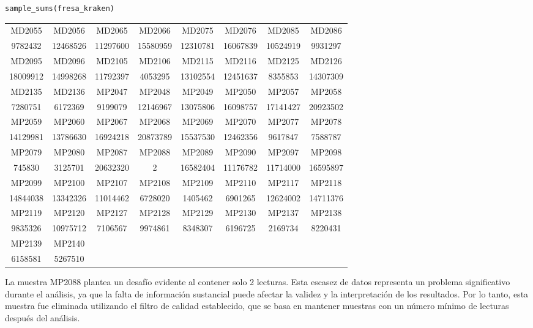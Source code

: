 \begin{lstlisting}[basicstyle=\small] 
sample_sums(fresa_kraken)
\end{lstlisting}
\resizebox{0.9\textwidth}{!} {
\begin{tabular}{ c c c c c c c c }
MD2055 & MD2056 & MD2065 & MD2066 & MD2075 & MD2076 & MD2085 & MD2086 \\
9782432 & 12468526 & 11297600 & 15580959 & 12310781 & 16067839 & 10524919 & 9931297 \\
MD2095 & MD2096 & MD2105 & MD2106 & MD2115 & MD2116 & MD2125 & MD2126 \\
18009912 & 14998268 & 11792397 & 4053295 & 13102554 & 12451637 & 8355853 & 14307309 \\
MD2135 & MD2136 & MP2047 & MP2048 & MP2049 & MP2050 & MP2057 & MP2058 \\
7280751 & 6172369 & 9199079 & 12146967 & 13075806 & 16098757 & 17141427 & 20923502 \\
MP2059 & MP2060 & MP2067 & MP2068 & MP2069 & MP2070 & MP2077 & MP2078 \\
14129981 & 13786630 & 16924218 & 20873789 & 15537530 & 12462356 & 9617847 & 7588787 \\
MP2079 & MP2080 & MP2087 & MP2088 & MP2089 & MP2090 & MP2097 & MP2098 \\
745830 & 3125701 & 20632320 & 2 & 16582404 & 11176782 & 11714000 & 16595897 \\
MP2099 & MP2100 & MP2107 & MP2108 & MP2109 & MP2110 & MP2117 & MP2118 \\
14844038 & 13342326 & 11014462 & 6728020 & 1405462 & 6901265 & 12624002 & 14711376 \\
MP2119 & MP2120 & MP2127 & MP2128 & MP2129 & MP2130 & MP2137 & MP2138 \\
9835326 & 10975712 & 7106567 & 9974861 & 8348307 & 6196725 & 2169734 & 8220431 \\
MP2139 & MP2140 \\
6158581 & 5267510
\end{tabular}
}

La muestra MP2088 plantea un desafío evidente al contener solo 2 lecturas. Esta escasez de datos representa un problema significativo durante el análisis, ya que la falta de información sustancial puede afectar la validez y la interpretación de los resultados. Por lo tanto, esta muestra fue eliminada utilizando el filtro de calidad establecido, que se basa en mantener muestras con un número mínimo de lecturas después del análisis.\\


